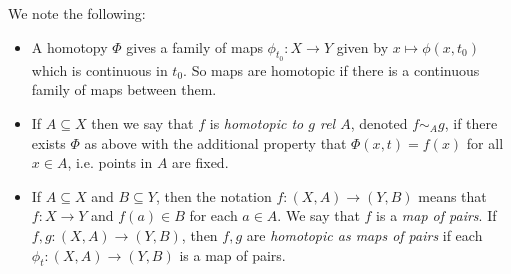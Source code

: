 \begin{remark}
  We note the following:
  \begin{itemize}
    \item A homotopy $\Phi$ gives a family of maps
      $\phi_{t_0} : X \to Y$ given by
      $x \mapsto \phi(x, t_0)$ which is continuous
      in $t_0$. So maps are homotopic if there is a
      continuous family of maps between them.
    \item If $A \subseteq X$ then we say that
      $f$ is \emph{homotopic to $g$ rel $A$},
      denoted $f \sim_A g$, if there exists
      $\Phi$ as above with the additional property
      that $\Phi(x, t) = f(x)$ for all $x \in A$,
      i.e. points in $A$ are fixed.
    \item If $A \subseteq X$ and $B \subseteq Y$,
      then the notation $f : (X, A) \to (Y, B)$
      means that $f : X \to Y$ and
      $f(a) \in B$ for each $a \in A$.
      We say that $f$ is a \emph{map of pairs}.
      If $f, g : (X, A) \to (Y, B)$, then $f, g$
      are \emph{homotopic as maps of pairs} if each
      $\phi_t : (X, A) \to (Y, B)$ is a map of pairs.
  \end{itemize}
\end{remark}
